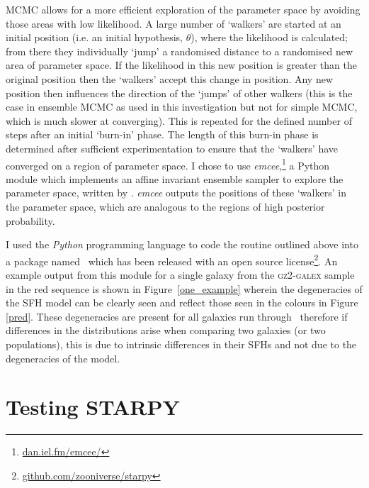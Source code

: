 MCMC allows for a more efficient exploration of the parameter space by avoiding those areas with low likelihood. A large number of `walkers' are started at an initial position (i.e. an initial hypothesis, $\theta$), where the likelihood is calculated; from there they individually `jump' a randomised distance to a randomised new area of parameter space. If the likelihood in this new position is greater than the original position then the `walkers' accept this change in position. Any new position then influences the direction of the  `jumps' of other walkers (this is the case in ensemble MCMC as used in this investigation but not for simple MCMC, which is much slower at converging). This is repeated for the defined number of steps after an initial `burn-in' phase. The length of this burn-in phase is determined after sufficient experimentation to ensure that the `walkers' have converged on a region of parameter space. I chose to use \emph{emcee},\footnote{\url{dan.iel.fm/emcee/}} a Python module which implements an affine invariant ensemble sampler to explore the parameter space, written by \cite{emcee13}. \emph{emcee} outputs the positions of these `walkers' in the parameter space, which are analogous to the regions of high posterior probability. 

I used the \emph{Python} programming language to code the routine outlined above into a package named \starpy ~which has been released with an open source license\footnote{\url{github.com/zooniverse/starpy}}. An example output from this module for a single galaxy from the \textsc{gz2-galex} sample in the red sequence is shown in Figure~\ref{one_example} wherein the degeneracies of the SFH model can be clearly seen and reflect those seen in the colours in Figure \ref{pred}. These degeneracies are present for all galaxies run through \starpy\ therefore if differences in the distributions arise when comparing two galaxies (or two populations), this is due to intrinsic differences in their SFHs and not due to the degeneracies of the model. 

\section{Testing STARPY}

